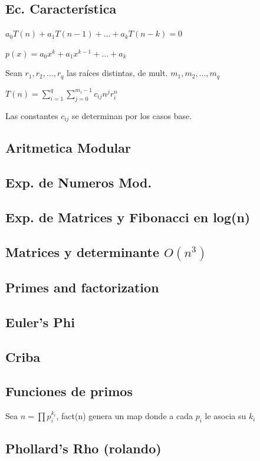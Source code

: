 \subsection{Ec. Característica}
$a_0T(n)+a_1T(n-1)+...+a_kT(n-k)=0$

$p(x)=a_0 x^k + a_1 x^{k-1} + ... + a_k$

Sean $r_1,r_2,...,r_q$ las raíces distintas, de mult. $m_1, m_2, ..., m_q$

$T(n)=\sum_{i=1}^q{\sum_{j=0}^{m_i - 1}c_{ij} n^j r_i^n}$

Las constantes $c_{ij}$ se determinan por los casos base.
\subsection{Aritmetica Modular}
\subsection{Exp. de Numeros Mod.}
\subsection{Exp. de Matrices y Fibonacci en log(n)}
\subsection{Matrices y determinante $O(n^3)$}
\subsection{Primes and factorization}
\subsection{Euler's Phi}
\subsection{Criba}
\subsection{Funciones de primos}
Sea $n=\prod{p_i^{k_i}}$, fact(n) genera un map donde a cada $p_i$ le asocia su $k_i$
\subsection{Phollard's Rho (rolando)}
